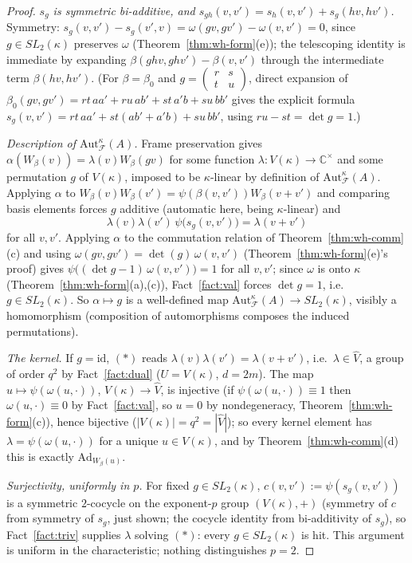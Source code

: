 \begin{proof}
\emph{$s_g$ is symmetric bi-additive, and $s_{gh}(v,v')=s_h(v,v')+s_g(hv,hv')$.}
Symmetry: $s_g(v,v')-s_g(v',v)=\omega(gv,gv')-\omega(v,v')=0$, since
$g\in SL_2(\kappa)$ preserves $\omega$ (Theorem~\ref{thm:wh-form}(e)); the
telescoping identity is immediate by expanding
$\beta(ghv,ghv')-\beta(v,v')$ through the intermediate term
$\beta(hv,hv')$. (For $\beta=\beta_0$ and $g=\left(\begin{smallmatrix}r&s\\t&u\end{smallmatrix}\right)$,
direct expansion of $\beta_0(gv,gv')=rt\,aa'+ru\,ab'+st\,a'b+su\,bb'$ gives
the explicit formula $s_g(v,v')=rt\,aa'+st(ab'+a'b)+su\,bb'$, using
$ru-st=\det g=1$.)

\emph{Description of $\mathrm{Aut}_{\mathcal{F}}^\kappa(A)$.} Frame
preservation gives $\alpha(W_\beta(v))=\lambda(v)W_\beta(gv)$ for some
function $\lambda:V(\kappa)\to\mathbb{C}^\times$ and some permutation $g$ of
$V(\kappa)$, imposed to be $\kappa$-linear by definition of
$\mathrm{Aut}_{\mathcal{F}}^\kappa(A)$. Applying $\alpha$ to
$W_\beta(v)W_\beta(v')=\psi(\beta(v,v'))W_\beta(v+v')$ and comparing basis
elements forces $g$ additive (automatic here, being $\kappa$-linear) and
\[
\lambda(v)\lambda(v')\,\psi\big(s_g(v,v')\big) = \lambda(v+v') \tag{$*$}
\]
for all $v,v'$. Applying $\alpha$ to the commutation relation of
Theorem~\ref{thm:wh-comm}(c) and using $\omega(gv,gv')=\det(g)\,\omega(v,v')$
(Theorem~\ref{thm:wh-form}(e)'s proof) gives
$\psi\big((\det g-1)\,\omega(v,v')\big)=1$ for all $v,v'$; since $\omega$ is
onto $\kappa$ (Theorem~\ref{thm:wh-form}(a),(c)), Fact~\ref{fact:val} forces
$\det g=1$, i.e.\ $g\in SL_2(\kappa)$. So $\alpha\mapsto g$ is a well-defined
map $\mathrm{Aut}_{\mathcal{F}}^\kappa(A)\to SL_2(\kappa)$, visibly a
homomorphism (composition of automorphisms composes the induced
permutations).

\emph{The kernel.} If $g=\mathrm{id}$, $(*)$ reads
$\lambda(v)\lambda(v')=\lambda(v+v')$, i.e.\ $\lambda\in\hat V$, a group of
order $q^2$ by Fact~\ref{fact:dual} ($U=V(\kappa)$, $d=2m$). The map
$u\mapsto\psi(\omega(u,\cdot))$, $V(\kappa)\to\hat V$, is injective (if
$\psi(\omega(u,\cdot))\equiv 1$ then $\omega(u,\cdot)\equiv 0$ by
Fact~\ref{fact:val}, so $u=0$ by nondegeneracy, Theorem~\ref{thm:wh-form}(c)),
hence bijective ($|V(\kappa)|=q^2=|\hat V|$); so every kernel element has
$\lambda=\psi(\omega(u,\cdot))$ for a unique $u\in V(\kappa)$, and by
Theorem~\ref{thm:wh-comm}(d) this is exactly $\mathrm{Ad}_{W_\beta(u)}$.

\emph{Surjectivity, uniformly in $p$.} For fixed $g\in SL_2(\kappa)$,
$c(v,v'):=\psi(s_g(v,v'))$ is a symmetric $2$-cocycle on the exponent-$p$
group $(V(\kappa),+)$ (symmetry of $c$ from symmetry of $s_g$, just shown;
the cocycle identity from bi-additivity of $s_g$), so Fact~\ref{fact:triv}
supplies $\lambda$ solving $(*)$: every $g\in SL_2(\kappa)$ is hit. This
argument is uniform in the characteristic; nothing distinguishes $p=2$.
\end{proof}

